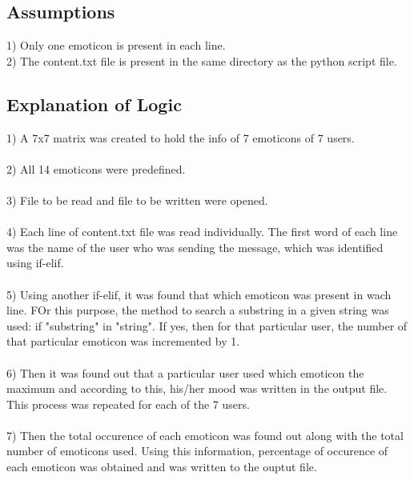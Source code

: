 \documentclass[a4paper,12pt]{article}
\begin{document}
  \newpage
  \begin{center}
    \section{Assumptions}
  \end{center}
  \begin{small}
    1) Only one emoticon is present in each line.\\
    2) The content.txt file is present in the same directory as the python script file.\\
  \end{small}
  \newpage
  \begin{center}
    \section{Explanation of Logic}
  \end{center}
  \begin{small}
    1) A 7x7 matrix was created to hold the info of 7 emoticons of 7 users.\\
    \\2) All 14 emoticons were predefined.\\
    \\3) File to be read and file to be written were opened.\\
    \\4) Each line of content.txt file was read individually. The first word of each line was the name of the user who was sending the message,
    which was identified using if-elif.\\
    \\5) Using another if-elif, it was found that which emoticon was present in wach line. FOr this purpose, the method to search a substring in
    a given string was used: if "substring" in "string". If yes, then for that particular user, the number of that particular emoticon was incremented by 1.\\
    \\6) Then it was found out that a particular user used which emoticon the maximum and according to this, his/her mood was written in the output file.
    This process was repeated for each of the 7 users.\\
    \\7) Then the total occurence of each emoticon was found out along with the total number of emoticons used. Using this information, percentage of
    occurence of each emoticon was obtained and was written to the ouptut file.
  \end{small}
  
\end{document}
